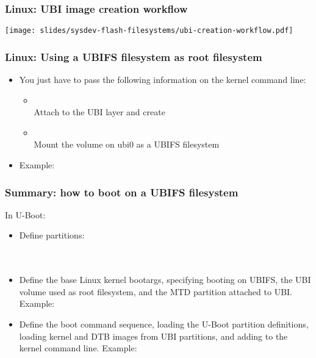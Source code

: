 \begin{frame}
  \frametitle{Linux: UBI image creation workflow}
  \begin{center}
    \texttt{[image: slides/sysdev-flash-filesystems/ubi-creation-workflow.pdf]}
  \end{center}
\end{frame}

\begin{frame}
  \frametitle{Linux: Using a UBIFS filesystem as root filesystem}
  \begin{itemize}
  \item You just have to pass the following information on the kernel
    command line:
    \begin{itemize}
    \item {}\\
      Attach  to the UBI layer and create 
    \item {}\\
      Mount the  volume on ubi0 as a UBIFS filesystem
    \end{itemize}
  \item Example: 
  \end{itemize}
\end{frame}

\begin{frame}
  \frametitle{Summary: how to boot on a UBIFS filesystem}
  In U-Boot:
  \begin{itemize}
  \item Define partitions:\\
     \\
     \\
  \item Define the base Linux kernel bootargs, specifying booting
     on UBIFS, the UBI volume used as root filesystem, and the MTD
     partition attached to UBI. Example:\\
  \item Define the boot command sequence, loading the U-Boot partition
     definitions, loading kernel and DTB images from UBI partitions,
     and adding  to the kernel command
     line. Example:\\
  \end{itemize}
\end{frame}


